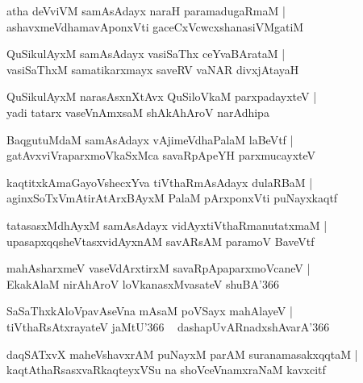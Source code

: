 \documentclass[twoside,12pt,openright]{book}
\newcounter{shloka}[chapter]
\begin{document}
\begin{shloka}
atha deVviVM samAsAdayx naraH paramadugaRmaM |\\
ashavxmeVdhamavAponxVti gaceCxVcwcxshanasiVMgatiM 
\end{shloka}

\begin{shloka}
QuSikulAyxM samAsAdayx vasiSaThx ceYvaBArataM |\\
vasiSaThxM samatikarxmayx saveRV vaNAR divxjAtayaH
\end{shloka}

\begin{shloka}
QuSikulAyxM narasAsxnXtAvx QuSiloVkaM parxpadayxteV |\\
yadi tatarx vaseVnAmxsaM shAkAhAroV narAdhipa 
\end{shloka}

\begin{shloka}
BaqgutuMdaM samAsAdayx vAjimeVdhaPalaM laBeVtf |\\
gatAvxviVraparxmoVkaSxMca savaRpApeYH parxmucayxteV 
\end{shloka}

\begin{shloka}
kaqtitxkAmaGayoVshecxYva tiVthaRmAsAdayx dulaRBaM |\\
aginxSoTxVmAtirAtArxBAyxM PalaM  pArxponxVti puNayxkaqtf 
\end{shloka}

\begin{shloka}
tatasasxMdhAyxM samAsAdayx vidAyxtiVthaRmanutatxmaM |\\
upasapxqqsheVtasxvidAyxnAM savARsAM paramoV BaveVtf 
\end{shloka}

\begin{shloka}
mahAsharxmeV vaseVdArxtirxM savaRpApaparxmoVcaneV |\\
EkakAlaM nirAhAroV loVkanasxMvasateV shuBA\char'366 
\end{shloka}

\begin{shloka}
SaSaThxkAloVpavAseVna mAsaM poVSayx mahAlayeV |\\
tiVthaRsAtxrayateV jaMtU\char'366 ~ dashapUvARnadxshAvarA\char'366
\end{shloka}

\begin{shloka}
daqSATxvX maheVshavxrAM puNayxM parAM suranamasakxqqtaM |\\
kaqtAthaRsasxvaRkaqteyxVSu na shoVceVnamxraNaM kavxcitf 
\end{shloka}
\end{document}
